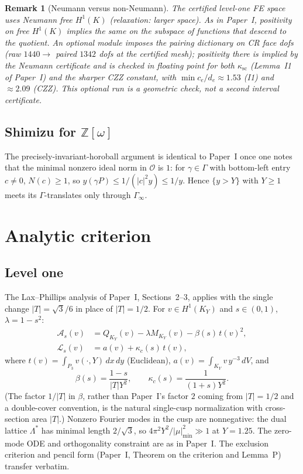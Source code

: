 \documentclass[11pt]{amsart}
\newtheorem{remark}[theorem]{Remark}
\newcommand{\ZZ}{\mathbb{Z}}
\begin{document}
\begin{remark}[Neumann versus non-Neumann]
The certified level-one FE space uses Neumann free $H^1(K)$ (relaxation:
larger space).  As in Paper~I, positivity on free $H^1(K)$ implies the
same on the subspace of functions that descend to the quotient.  An
optional module imposes the pairing dictionary on CR face dofs (raw
$1440\to$ paired $1342$ dofs at the certified mesh); positivity there is
implied by the Neumann certificate and is checked in floating point for
both $\kappa_{\mathrm{sc}}$ (Lemma~I1 of Paper~I) and the sharper CZZ
constant, with $\min c_e/d_e\approx 1.53$ (I1) and $\approx 2.09$ (CZZ).
This optional run is a geometric check, not a second interval
certificate.
\end{remark}

\subsection{Shimizu for $\ZZ[\omega]$}

The precisely-invariant-horoball argument is identical to Paper~I once one
notes that the minimal nonzero ideal norm in $\mathcal{O}$ is $1$: for
$\gamma\in\Gamma$ with bottom-left entry $c\neq 0$,
$N(c)\ge 1$, so $y(\gamma P)\le 1/(|c|^2 y)\le 1/y$.  Hence $\{y>Y\}$ with
$Y\ge 1$ meets its $\Gamma$-translates only through $\Gamma_\infty$.

\section{Analytic criterion}\label{sec:crit}

\subsection{Level one}

The Lax--Phillips analysis of Paper~I, Sections~2--3, applies with the
single change $|T|=\sqrt{3}/6$ in place of $|T|=1/2$.  For
$v\in H^1(K_Y)$ and $s\in(0,1)$, $\lambda=1-s^2$:
\begin{align*}
  \mathcal{A}_s(v)
  &=Q_{K_Y}(v)-\lambda M_{K_Y}(v)-\beta(s)\,t(v)^2,\\
  \mathcal{L}_s(v)
  &=a(v)+\kappa_c(s)\,t(v),
\end{align*}
where $t(v)=\int_{P_3}v(\cdot,Y)\,dx\,dy$ (Euclidean),
$a(v)=\int_{K_Y}v\,y^{-3}\,dV$, and
\begin{equation}\label{eq:beta1}
  \beta(s)=\frac{1-s}{|T|Y^2},\qquad
  \kappa_c(s)=\frac{1}{(1+s)Y^2}.
\end{equation}
(The factor $1/|T|$ in $\beta$, rather than Paper~I's factor $2$ coming
from $|T|=1/2$ and a double-cover convention, is the natural single-cusp
normalization with cross-section area $|T|$.)  Nonzero Fourier modes in
the cusp are nonnegative: the dual lattice $\Lambda^*$ has minimal length
$2/\sqrt{3}$, so $4\pi^2 Y^2/|\mu|_{\min}^2\gg 1$ at $Y=1.25$.  The
zero-mode ODE and orthogonality constraint are as in Paper~I.  The
exclusion criterion and pencil form (Paper~I, Theorem on the criterion
and Lemma~P) transfer verbatim.
\end{document}

